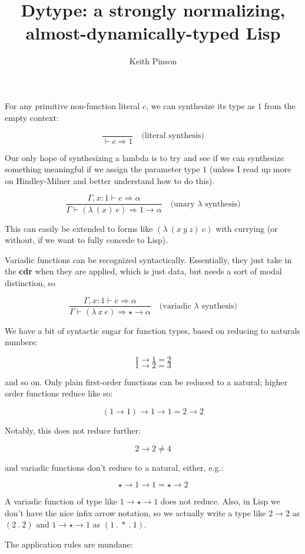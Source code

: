 \documentclass{article}
\title{Dytype: a strongly normalizing, almost-dynamically-typed Lisp}
\author{Keith Pinson}
\begin{document}
\maketitle

For any primitive non-function literal $c$, we can synthesize its type as $1$
from the empty context:

\[ \frac{}{\vdash{}c\mathbin{\Rightarrow}1}\quad\text{(literal synthesis)} \]

Our only hope of synthesizing a lambda is to try and see if we can synthesize
something meaningful if we assign the parameter type $1$ (unless I read up more
on Hindley-Milner and better understand how to do this).

\[ \frac{\Gamma,x\mathbin{:}1\vdash e\mathbin{\Rightarrow}\alpha}{\Gamma\vdash
    (\lambda~(x)~e)\mathbin{\Rightarrow}1\to\alpha}\quad\text{(unary
    $\lambda$ synthesis)} \]

This can easily be extended to forms like $(\lambda~(x~y~z)~e)$ with
currying (or without, if we want to fully concede to Lisp).

Variadic functions can be recognized syntactically. Essentially, they just take
in the \textbf{cdr} when they are applied, which is just data, but needs a
sort of modal distinction, so

\[ \frac{\Gamma,x\mathbin{:}1\vdash e\mathbin{\Rightarrow}\alpha}{\Gamma\vdash
    (\lambda~x~e)\mathbin{\Rightarrow}\star\to\alpha}\quad\text{(variadic
    $\lambda$ synthesis)} \]

We have a bit of syntactic sugar for function types, based on reducing to
naturals numbers:

\[ 1\to1 = 2 \]
\[ 1\to2 = 3 \]

and so on. Only plain first-order functions can be reduced to a natural;
higher order functions reduce like so:

\[ (1\to{}1)\to{}1\to{}1 = 2\to{}2 \]

Notably, this does not reduce further:

\[ 2\to{}2 \not = 4 \]

and variadic functions don't reduce to a natural, either, e.g.:

\[ \star\to{}1\to{}1 =
  \star\to{}2 \]

A variadic function of type like
$1\to\star\to{}1$ does not reduce. Also, in
Lisp we don't have the nice infix arrow notation, so we actually write a type
like $2\to{}2$ as $(2~.~2)$ and $1\to\star\to{}1$ as $(1~.~*~.~1)$.

The application rules are mundane:
\end{document}
